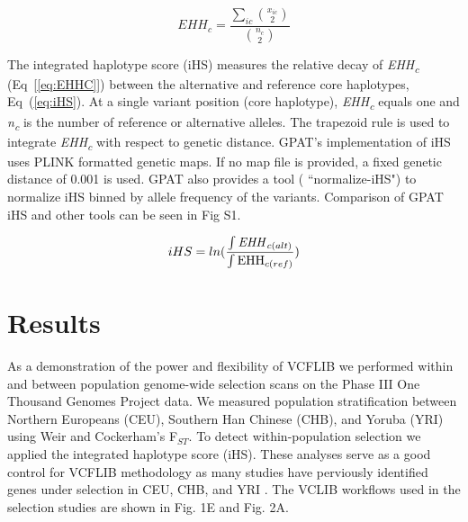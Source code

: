 \documentclass[10pt,letterpaper]{article}
\begin{document}
\begin{equation}\label{eq:EHHC} 
EHH_c=\frac{\sum_{ic} \binom{x_{ic}}{2}}{\binom{n_c}{2}}
\end{equation}

The integrated haplotype score (iHS) measures the relative decay of \textit{EHH\textsubscript{c}} (Eq~[\ref{eq:EHHC}]) between the alternative and reference core haplotypes,  Eq~(\ref{eq:iHS})\cite{voight}.  At a single variant position (core haplotype), \textit{EHH\textsubscript{c}} equals one and \textit{n\textsubscript{c}} is the number of reference or alternative alleles.  The trapezoid rule is used to integrate  \textit{EHH\textsubscript{c}} with respect to genetic distance.  GPAT's implementation of iHS uses PLINK formatted genetic maps\cite{plink}.  If no map file is provided, a fixed genetic distance of 0.001 is used.  GPAT also provides a tool ( ``normalize-iHS") to normalize iHS binned by allele frequency of the variants.  Comparison of GPAT iHS and other tools can be seen in Fig S1\cite{selscan}\cite{voight}.

\begin{equation}\label{eq:iHS} 
iHS = ln(\frac{\int \textrm{\textit{EHH}}_{c(alt)}}{ \int \textrm{EHH}_{c(ref)} } )
\end{equation}


\section*{Results}

As a demonstration of the power and flexibility of VCFLIB we performed within and between population genome-wide selection scans on the Phase III One Thousand Genomes Project data\cite{1kg}.  We measured population stratification between Northern Europeans (CEU), Southern Han Chinese (CHB), and Yoruba (YRI) using Weir and Cockerham's  F$_{ST}$. To detect within-population selection we applied the integrated haplotype score (iHS).  These analyses serve as a good control for VCFLIB methodology as many studies have perviously identified genes under selection in CEU, CHB, and YRI \cite{pickrell, sabeti, mathieson, weir}.  The VCLIB workflows used in the selection studies are shown in Fig. 1E and Fig. 2A.
\end{document}
